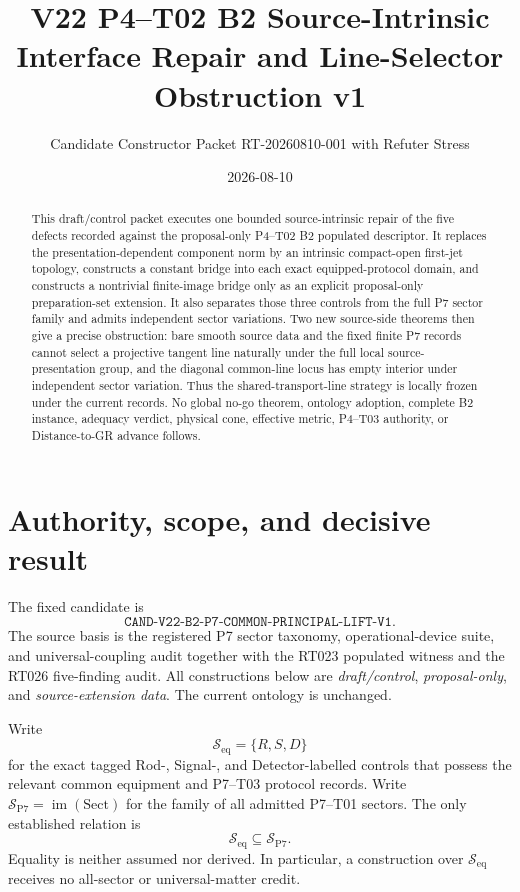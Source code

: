\documentclass[11pt]{article}
\title{V22 P4--T02 B2 Source-Intrinsic Interface Repair and Line-Selector Obstruction v1}
\author{Candidate Constructor Packet RT-20260810-001 with Refuter Stress}
\date{2026-08-10}
\newcommand{\Seq}{\mathcal S_{\mathrm{eq}}}
\newcommand{\Sall}{\mathcal S_{\mathrm{P7}}}
\begin{document}
\maketitle

\begin{abstract}
This draft/control packet executes one bounded source-intrinsic repair of the
five defects recorded against the proposal-only P4--T02 B2 populated
descriptor.  It replaces the presentation-dependent component norm by an
intrinsic compact-open first-jet topology, constructs a constant bridge into
each exact equipped-protocol domain, and constructs a nontrivial finite-image
bridge only as an explicit proposal-only preparation-set extension.
It also separates those three controls from the full P7 sector family and
admits independent sector variations.  Two new source-side theorems then give
a precise obstruction: bare smooth source data and the fixed finite P7 records
cannot select a projective tangent line naturally under the full local
source-presentation group, and the diagonal common-line locus has empty
interior under independent sector variation.  Thus the shared-transport-line
strategy is locally frozen under the current records.  No global no-go theorem,
ontology adoption, complete B2 instance, adequacy verdict, physical cone,
effective metric, P4--T03 authority, or Distance-to-GR advance follows.
\end{abstract}

\section{Authority, scope, and decisive result}

The fixed candidate is
\[
 \texttt{CAND-V22-B2-P7-COMMON-PRINCIPAL-LIFT-V1}.
\]
The source basis is the registered P7 sector taxonomy, operational-device
suite, and universal-coupling audit together with the RT023 populated witness
and the RT026 five-finding audit.  All constructions below are
\emph{draft/control}, \emph{proposal-only}, and \emph{source-extension data}.
The current ontology is unchanged.

Write
\[
 \Seq=\{R,S,D\}
\]
for the exact tagged Rod-, Signal-, and Detector-labelled controls that possess
the relevant common equipment and P7--T03 protocol records.  Write
\(\Sall=\operatorname{im}(\mathrm{Sect})\) for the family of all admitted
P7--T01 sectors.  The only established relation is
\[
 \Seq\subseteq\Sall.
\]
Equality is neither assumed nor derived.  In particular, a construction over
\(\Seq\) receives no all-sector or universal-matter credit.
\end{document}
